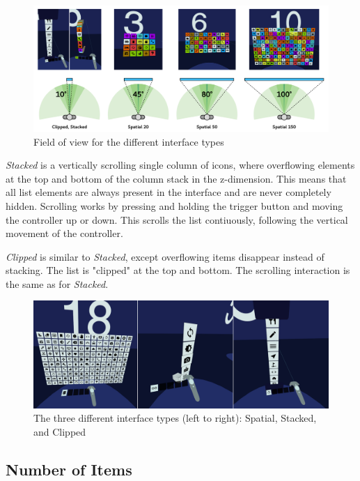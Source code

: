 \documentclass{tufte-book} %
\begin{document}
\begin{figure}[h]
  \includegraphics[width=\linewidth]{fov-types.png}
  \caption{Field of view for the different interface types}
  \label{fig:fov-types}
\end{figure}

\emph{Stacked} is a vertically scrolling single column of icons, where overflowing elements at the top and bottom of the column stack in the z-dimension. This means that all list elements are always present in the interface and are never completely hidden. Scrolling works by pressing and holding the trigger button and moving the controller up or down. This scrolls the list contiuously, following the vertical movement of the controller.

\emph{Clipped} is similar to \emph{Stacked}, except overflowing items disappear instead of stacking. The list is "clipped" at the top and bottom. The scrolling interaction is the same as for \emph{Stacked}.

\begin{figure}[h]
\includegraphics[width=\linewidth]{interface-types.png}
\caption{The three different interface types (left to right): Spatial, Stacked, and Clipped}
\label{fig:interface-types}
\end{figure}


\subsection{Number of Items}
\end{document}
